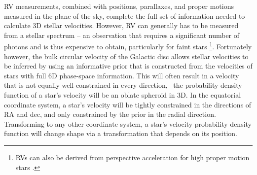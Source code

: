 RV measurements, combined with positions, parallaxes, and proper motions
measured in the plane of the sky, complete the full set of information needed
to calculate 3D stellar velocities.
However, RV can generally has to be measured from a stellar spectrum -- an
observation that requires a significant number of photons and is thus
expensive to obtain, particularly for faint stars \footnote{RVs can also be
derived from perspective acceleration for high proper motion stars
\citep[\eg][]{lindegren2021}.}.
Fortunately however, the bulk circular velocity of the Galactic disc allows
stellar velocities to be inferred by using an informative prior that is
constructed from the velocities of stars with full 6D phase-space information.
This will often result in a velocity that is not equally well-constrained in
every direction, \ie\ the probability density function of a star's velocity
will be an oblate spheroid in 3D.
In the equatorial coordinate system, a star's velocity will be tightly
constrained in the directions of RA and dec, and only constrained by
the prior in the radial direction.
Transforming to any other coordinate system, a star's velocity probability
density function will change shape via a transformation that depends on its
position.


